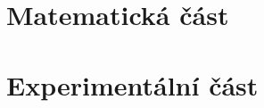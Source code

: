 \documentclass[12pt,a4paper]{article}
\begin{document}
% 
% 
% 

\tableofcontents
\newpage
% 

% 
% 
% 
% 

\part{Matematická část}





\part{Experimentální část}



% 

% 
% 
% 


% 

\end{document}
